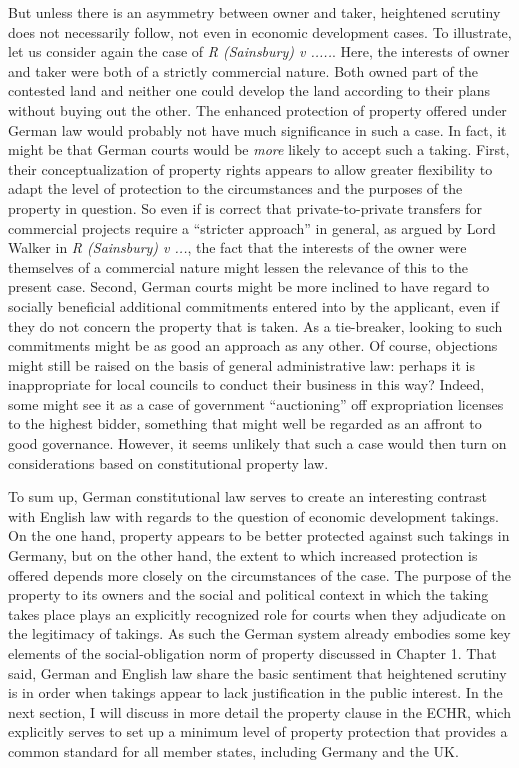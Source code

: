 But unless there is an asymmetry between owner and taker, heightened scrutiny does not necessarily follow, not even in economic development cases. To illustrate, let us consider again the case of {\it R (Sainsbury) v .....}. Here, the interests of owner and taker were both of a strictly commercial nature. Both owned part of the contested land and neither one could develop the land according to their plans without buying out the other. The enhanced protection of property offered under German law would probably not have much significance in such a case. In fact, it might be that German courts would be {\it more} likely to accept such a taking. First, their conceptualization of property rights appears to allow greater flexibility to adapt the level of protection to the circumstances and the purposes of the property in question. So even if is correct that private-to-private transfers for commercial projects require a ``stricter approach'' in general, as argued by Lord Walker in {\it R (Sainsbury) v ...}, the fact that the interests of the owner were themselves of a commercial nature might lessen the relevance of this to the present case. Second, German courts might be more inclined to have regard to socially beneficial additional commitments entered into by the applicant, even if they do not concern the property that is taken. As a tie-breaker, looking to such commitments might be as good an approach as any other. Of course, objections might still be raised on the basis of general administrative law: perhaps it is inappropriate for local councils to conduct their business in this way? Indeed, some might see it as a  case of government ``auctioning'' off expropriation licenses to the highest bidder, something that might well be regarded as an affront to good governance. However, it seems unlikely that such a case would then turn on considerations based on constitutional property law. 

To sum up, German constitutional law serves to create an interesting contrast with English law with regards to the question of economic development takings. On the one hand, property appears to be better protected against such takings in Germany, but on the other hand, the extent to which increased protection is offered depends more closely on the circumstances of the case. The purpose of the property to its owners and the social and political context in which the taking takes place plays an explicitly recognized role for courts when they adjudicate on the legitimacy of takings. As such the German system already embodies some key elements of the social-obligation norm of property discussed in Chapter 1. That said, German and English law share the basic sentiment that heightened scrutiny is in order when takings appear to lack justification in the public interest. In the next section, I will discuss in more detail the property clause in the ECHR, which explicitly serves to set up a minimum level of property protection that provides a common standard for all member states, including Germany and the UK.

